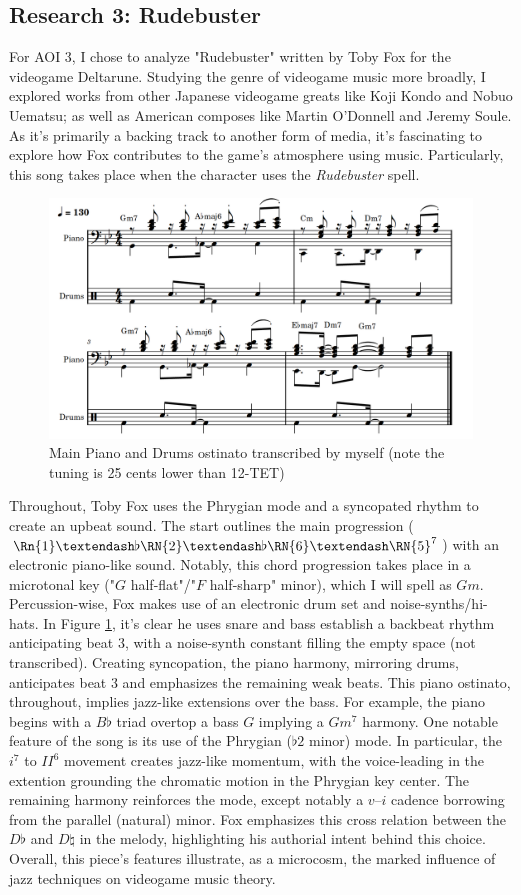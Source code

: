 \documentclass[12pt]{article}
\begin{document}
\subsection{Research 3: Rudebuster}

For AOI 3, I chose to analyze "Rudebuster"\autocite{rudebuster} written by Toby Fox for the videogame Deltarune. Studying the genre of videogame music more broadly, I explored works from other Japanese videogame greats like Koji Kondo and Nobuo Uematsu; as well as American composes like Martin O'Donnell and Jeremy Soule. As it's primarily a backing track to another form of media, it's fascinating to explore how Fox contributes to the game's atmosphere using music. Particularly, this song takes place when the character uses the \textit{Rudebuster} spell.
\begin{figure}[ht]
\centering
\includegraphics[width=0.85\linewidth]{rudebuster}
\caption{Main Piano and Drums ostinato transcribed by myself (note the tuning is 25 cents lower than 12-TET)}
\label{fig:rude}
\end{figure}

Throughout, Toby Fox uses the Phrygian mode and a syncopated rhythm to create an upbeat sound. The start outlines the main progression ($\Rn{1}–\flat\RN{2}–\flat\RN{6}–\RN{5}^7$) with an electronic piano-like sound. Notably, this chord progression takes place in a microtonal key ("$G$ half-flat"/"$F$ half-sharp" minor), which I will  spell as $Gm$. Percussion-wise, Fox makes use of an electronic drum set and noise-synths/hi-hats. In Figure \ref{fig:rude}, it's clear he uses snare and bass establish a backbeat rhythm anticipating beat 3, with a noise-synth constant filling the empty space (not transcribed). Creating syncopation, the piano harmony, mirroring drums, anticipates beat 3 and emphasizes the remaining weak beats. This piano ostinato, throughout, implies jazz-like extensions over the bass. For example, the piano begins with a $B\flat$ triad overtop a bass $G$ implying a $Gm^7$ harmony.
One notable feature of the song is its use of the Phrygian ($\flat 2$ minor) mode. In particular, the $i^{7}$ to $II^6$ movement creates jazz-like momentum, with the voice-leading in the extention grounding the chromatic motion in the Phrygian key center. The remaining harmony reinforces the mode, except notably a $v–i$ cadence borrowing from the parallel (natural) minor. Fox emphasizes this cross relation between the $D\flat$ and $D\natural$ in the melody, highlighting his authorial intent behind this choice. Overall, this piece's features illustrate, as a microcosm, the marked influence of jazz techniques on videogame music theory.
\end{document}
